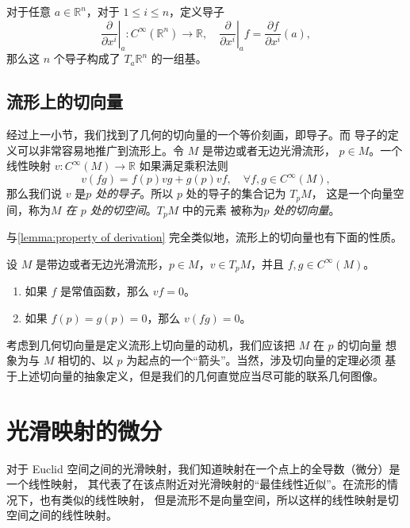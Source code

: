 \documentclass[fontset=none]{Notes}
\begin{document}
\begin{corollary}\label{coro:bases of geometry tangent space}
  对于任意 $a\in\mathbb{R}^n$，对于 $1\leq i\leq n$，定义导子
  \[
    \left.\frac{\partial}{\partial x^i}\right|_a:C^\infty(\mathbb{R}^n)\to\mathbb{R},\quad
    \left.\frac{\partial}{\partial x^i}\right|_af=\frac{\partial f}{\partial x^i}(a),
  \]
  那么这 $n$ 个导子构成了 $T_a\mathbb{R}^n$ 的一组基。
\end{corollary}

\subsection{流形上的切向量}

经过上一小节，我们找到了几何的切向量的一个等价刻画，即导子。而
导子的定义可以非常容易地推广到流形上。令 $M$ 是带边或者无边光滑流形，
$p\in M$。一个线性映射 $v:C^\infty(M)\to\mathbb{R}$ 如果满足乘积法则
\[
  v(fg)=f(p)vg+g(p)vf,\quad \forall f,g\in C^\infty(M) , 
\]
那么我们说 $v$ 是\emph{$p$ 处的导子}。所以 $p$ 处的导子的集合记为 $T_pM$，
这是一个向量空间，称为\emph{$M$ 在 $p$ 处的切空间}。$T_pM$ 中的元素
被称为\emph{$p$ 处的切向量}。

与\autoref{lemma:property of derivation} 完全类似地，流形上的切向量也有下面的性质。

\begin{lemma}[流形上切向量的性质]\label{lemma:property of tangent vector}
  设 $M$ 是带边或者无边光滑流形，$p\in M$，$v\in T_pM$，并且 $f,g\in C^\infty(M)$。
  \begin{enumerate}
    \item 如果 $f$ 是常值函数，那么 $vf=0$。
    \item 如果 $f(p)=g(p)=0$，那么 $v(fg)=0$。
  \end{enumerate}
\end{lemma}

考虑到几何切向量是定义流形上切向量的动机，我们应该把 $M$ 在 $p$ 的切向量
想象为与 $M$ 相切的、以 $p$ 为起点的一个“箭头”。当然，涉及切向量的定理必须
基于上述切向量的抽象定义，但是我们的几何直觉应当尽可能的联系几何图像。

\section{光滑映射的微分}\label{sec:differential of map}

对于 Euclid 空间之间的光滑映射，我们知道映射在一个点上的全导数（微分）是一个线性映射，
其代表了在该点附近对光滑映射的“最佳线性近似”。在流形的情况下，也有类似的线性映射，
但是流形不是向量空间，所以这样的线性映射是切空间之间的线性映射。
\end{document}
